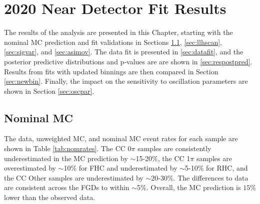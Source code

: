 \chapter{2020 Near Detector Fit Results}\label{sec:2020Fit}

The results of the analysis are presented in this Chapter, starting with the nominal MC prediction and fit validations in Sections \ref{sec:nommc}, \ref{sec:llhscan}, \ref{sec:sigvar}, and \ref{sec:asimov}. The data fit is presented in \ref{sec:datafit}, and the posterior predictive distributions and p-values are are shown in \ref{sec:respostpred}. Results from fits with updated binnings are then compared in Section \ref{sec:newbin}. Finally, the impact on the sensitivity to oscillation parameters are shown in Section \ref{sec:oscpar}.

\section{Nominal MC}\label{sec:nommc}

The data, unweighted MC, and nominal MC event rates for each sample are shown in Table \ref{tab:nomrates}. The CC 0$\pi$ samples are consistently underestimated in the MC prediction by $\sim$15-20$\%$, the CC 1$\pi$ samples are overestimated by $\sim$10$\%$ for FHC and underestimated by $\sim$5-10$\%$ for RHC, and the CC Other samples are underestimated by $\sim$20-30$\%$. The differences to data are consistent across the FGDs to within $\sim$5$\%$. Overall, the MC prediction is $15\%$ lower than the observed data.

